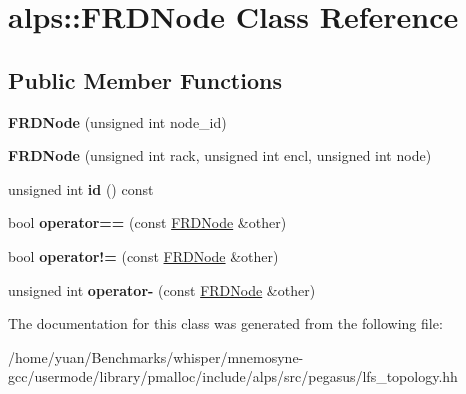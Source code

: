 \hypertarget{classalps_1_1FRDNode}{}\section{alps\+:\+:F\+R\+D\+Node Class Reference}
\label{classalps_1_1FRDNode}
\subsection*{Public Member Functions}
\begin{DoxyCompactItemize}
\item 
{\bfseries F\+R\+D\+Node} (unsigned int node\+\_\+id)\hypertarget{classalps_1_1FRDNode_a3bab23a8d25a3aecf06bafced43f5394}{}\label{classalps_1_1FRDNode_a3bab23a8d25a3aecf06bafced43f5394}

\item 
{\bfseries F\+R\+D\+Node} (unsigned int rack, unsigned int encl, unsigned int node)\hypertarget{classalps_1_1FRDNode_a29d2b46be6d598d1262662ee00a1495f}{}\label{classalps_1_1FRDNode_a29d2b46be6d598d1262662ee00a1495f}

\item 
unsigned int {\bfseries id} () const \hypertarget{classalps_1_1FRDNode_a0f843bde69e69062910ac352a68961e1}{}\label{classalps_1_1FRDNode_a0f843bde69e69062910ac352a68961e1}

\item 
bool {\bfseries operator==} (const \hyperlink{classalps_1_1FRDNode}{F\+R\+D\+Node} \&other)\hypertarget{classalps_1_1FRDNode_a845638568988450a40434397d8711e2d}{}\label{classalps_1_1FRDNode_a845638568988450a40434397d8711e2d}

\item 
bool {\bfseries operator!=} (const \hyperlink{classalps_1_1FRDNode}{F\+R\+D\+Node} \&other)\hypertarget{classalps_1_1FRDNode_a1a9b1c9cef0d692a8977f3f5bb9979c5}{}\label{classalps_1_1FRDNode_a1a9b1c9cef0d692a8977f3f5bb9979c5}

\item 
unsigned int {\bfseries operator-\/} (const \hyperlink{classalps_1_1FRDNode}{F\+R\+D\+Node} \&other)\hypertarget{classalps_1_1FRDNode_a2bae6e2d65b67c6ded12dcf5ae6e1226}{}\label{classalps_1_1FRDNode_a2bae6e2d65b67c6ded12dcf5ae6e1226}

\end{DoxyCompactItemize}


The documentation for this class was generated from the following file\+:\begin{DoxyCompactItemize}
\item 
/home/yuan/\+Benchmarks/whisper/mnemosyne-\/gcc/usermode/library/pmalloc/include/alps/src/pegasus/lfs\+\_\+topology.\+hh\end{DoxyCompactItemize}
